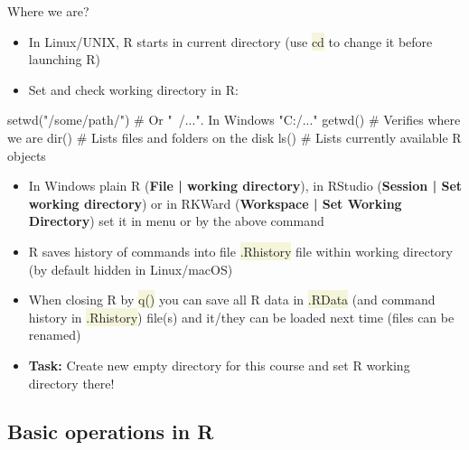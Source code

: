 \documentclass[compress, xelatex, 11pt, xcolor=svgnames, aspectratio=169, url={hyphens, lowtilde}]{beamer}
\renewcommand{\texttt}[1]{\colorbox{Beige}{{\ttfamily #1}}}
\begin{document}
\begin{frame}[fragile]{Where we are?}
	\begin{itemize}
		\item In Linux/UNIX, R starts in current directory (use \texttt{cd} to change it before launching R)
		\item \alert{Set and check working directory} in R:
	\end{itemize}
	\begin{spluscode}
    setwd("/some/path/") # Or "~/...". In Windows "C:/..."
    getwd() # Verifies where we are
    dir() # Lists files and folders on the disk
    ls() # Lists currently available R objects
	\end{spluscode}
	\begin{itemize}
		\item In Windows plain R (\textbf{File | working directory}), in RStudio (\textbf{Session | Set working directory}) or in RKWard (\textbf{Workspace | Set Working Directory}) set it in menu or by the above command
		\item R saves history of commands into file \texttt{.Rhistory} file within working directory (by default hidden in Linux/macOS)
		\item When closing R by \texttt{q()} you can save all R data in \texttt{.RData} (and command history in \texttt{.Rhistory}) file(s) and it/they can be loaded next time (files can be renamed)
		\item \alert{\textbf{Task:}} Create new empty directory for this course and set R working directory there!
	\end{itemize}
\end{frame}

\subsection{Basic operations in R}
\end{document}
